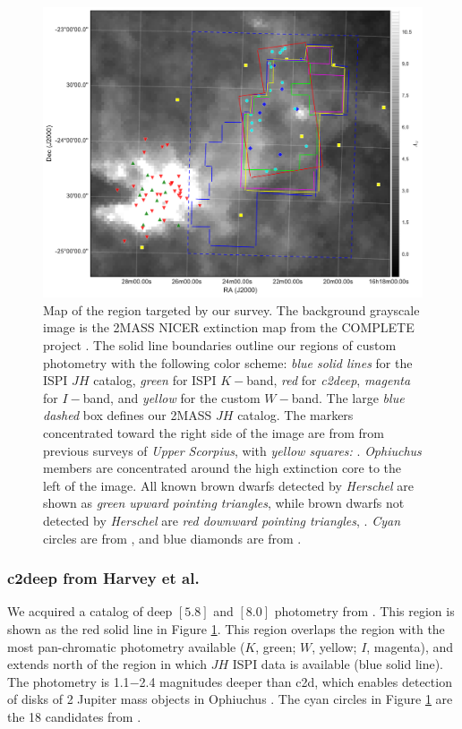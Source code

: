 \begin{figure}[ht!]
\caption[Map of the region of \emph{Ophiuchus} targeted in our survey]{Map of the region targeted by our survey.  The background grayscale image is the 2MASS NICER extinction map \citep{2008A&A...489..143L} from the COMPLETE project \citep{2006AJ....131.2921R}.  The solid line boundaries outline our regions of custom photometry with the following color scheme: \emph{blue solid lines} for the ISPI $JH$ catalog, \emph{green} for ISPI $K-$band, \emph{red} for \emph{c2deep}, \emph{magenta} for $I-$band, and \emph{yellow} for the custom $W-$band.  The large \emph{blue dashed} box defines our 2MASS $JH$ catalog.  The markers concentrated toward the right side of the image are from from previous surveys of \emph{Upper Scorpius}, with \emph{yellow squares:} \cite{2006AJ....131.3016S}.  \emph{Ophiuchus} members are concentrated around the high extinction core to the left of the image.  All known brown dwarfs detected by \emph{Herschel} are shown as \emph{green upward pointing triangles}, while brown dwarfs not detected by \emph{Herschel} are \emph{red downward pointing triangles}, \cite{2013A&A...559A.126A}. \emph{Cyan} circles are from \citet{2010ApJ...720.1374H}, and blue diamonds are from \citet{allers06}.\label{fig_star_chart}}
\centering
\includegraphics[scale=0.5]{chIMACS/figures/Ophiuchus_map}
\end{figure}


\subsubsection{c2deep from Harvey et al.}
We acquired a catalog of deep $[5.8]$ and $[8.0]$ photometry from \citet{2010ApJ...720.1374H}.  This region is shown as the red solid line in Figure \ref{fig_star_chart}.  This region overlaps the region with the most pan-chromatic photometry available ($K$, green; $W$, yellow; $I$, magenta), and extends north of the region in which $JH$ ISPI data is available (blue solid line).  The \citet{2010ApJ...720.1374H} photometry is 1.1$-$2.4 magnitudes deeper than c2d, which enables detection of disks of 2 Jupiter mass objects in Ophiuchus \citep{allers06}.  The cyan circles in Figure \ref{fig_star_chart} are the 18 candidates from \citet{2010ApJ...720.1374H}.  

